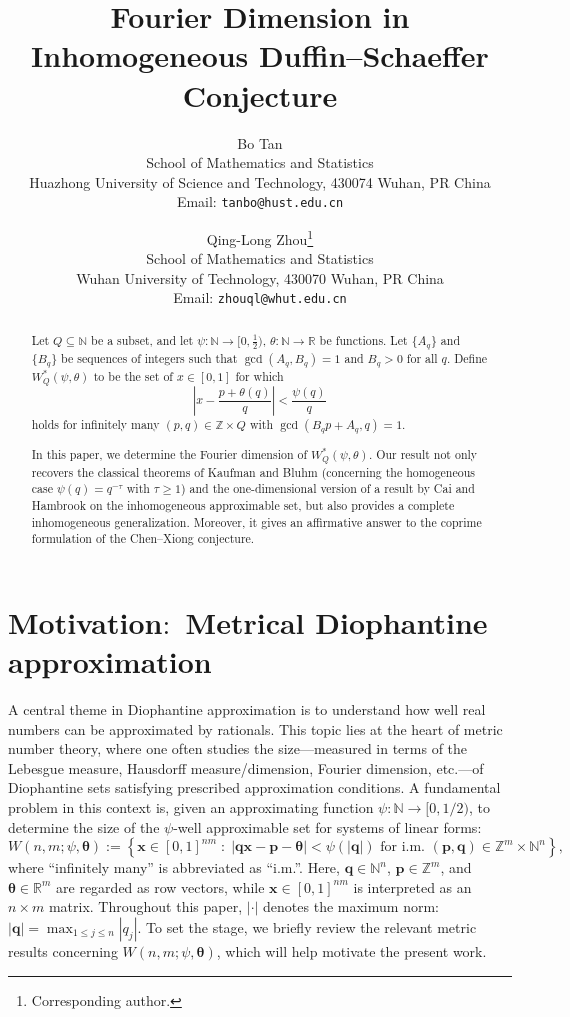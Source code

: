 \documentclass[12pt,a4paper,twoside]{article}
\title{ Fourier Dimension in Inhomogeneous Duffin--Schaeffer Conjecture}
\author{
  Bo Tan\\
  {\normalsize School of Mathematics and Statistics}\\
  {\normalsize Huazhong University of Science and Technology, 430074 Wuhan, PR China}\\
  {\normalsize Email: \texttt{tanbo@hust.edu.cn}}
  \and
  Qing-Long Zhou\footnote{Corresponding author.}\\
  {\normalsize School of Mathematics and Statistics}\\
  {\normalsize Wuhan University of Technology, 430070 Wuhan, PR China}\\
  {\normalsize Email: \texttt{zhouql@whut.edu.cn}}
}
\date{}
\begin{document}

\maketitle




\begin{abstract}
Let \(Q \subseteq \mathbb{N}\) be a subset, and let \(\psi\colon \mathbb{N} \to [0, \tfrac{1}{2})\), \(\theta\colon \mathbb{N} \to \mathbb{R}\) be functions. Let \(\{A_q\}\) and \(\{B_q\}\) be sequences of integers such that \(\gcd(A_q, B_q) = 1\) and \(B_q > 0\) for all \(q\). Define \(W_Q^{\ast}(\psi,\theta)\) to be the set of \(x \in [0,1]\) for which
\[
\left| x - \frac{p + \theta(q)}{q} \right| < \frac{\psi(q)}{q}
\]
holds for infinitely many \((p,q) \in \mathbb{Z} \times Q\) with \(\gcd(B_q p + A_q, q) = 1\).

In this paper, we determine the Fourier dimension of \(W_Q^{\ast}(\psi,\theta)\). Our result not only recovers the classical theorems of Kaufman and Bluhm (concerning the homogeneous case \(\psi(q) = q^{-\tau}\) with \(\tau \ge 1\)) and the one-dimensional version of a result by Cai and Hambrook on the inhomogeneous approximable set, but also provides a complete inhomogeneous generalization. Moreover, it gives an affirmative answer to the coprime formulation of the Chen--Xiong conjecture.
\end{abstract}



\section{Motivation$\colon$ Metrical Diophantine approximation}
 A central theme in Diophantine approximation is to understand how well real numbers can be approximated by rationals. This topic lies at the heart of metric number theory, where one often studies the size---measured in terms of the Lebesgue measure, Hausdorff measure/dimension, Fourier dimension, etc.---of Diophantine sets satisfying prescribed approximation conditions. A fundamental problem in this context is, given an approximating function \(\psi\colon \mathbb{N} \to [0, 1/2)\), to determine the size of the \(\psi\)-well approximable set for systems of linear forms:
\[
W(n,m;\psi,\bm{\theta}) := \left\{ \mathbf{x} \in [0,1]^{nm} \;:\; |\mathbf{q} \mathbf{x} - \mathbf{p} - \bm{\theta}| < \psi(|\mathbf{q}|) \text{ for i.m. } (\mathbf{p}, \mathbf{q}) \in \mathbb{Z}^m \times \mathbb{N}^n \right\},
\]
where ``infinitely many'' is abbreviated as ``i.m.''. Here, \(\mathbf{q} \in \mathbb{N}^n\), \(\mathbf{p} \in \mathbb{Z}^m\), and \(\bm{\theta} \in \mathbb{R}^m\) are regarded as row vectors, while \(\mathbf{x} \in [0,1]^{nm}\) is interpreted as an \(n \times m\) matrix. Throughout this paper, \(|\cdot|\) denotes the maximum norm$\colon$ \(|\mathbf{q}| = \max_{1 \le j \le n} |q_j|\). To set the stage, we briefly review the relevant metric results concerning \(W(n,m;\psi,\bm{\theta})\), which will help motivate the present work.
\end{document}
